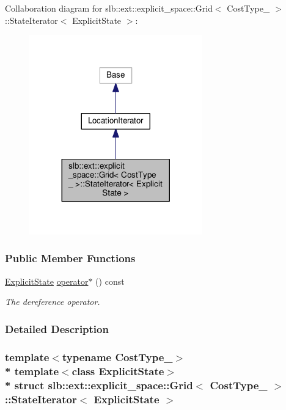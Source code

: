 Collaboration diagram for slb\+:\+:ext\+:\+:explicit\+\_\+space\+:\+:Grid$<$ Cost\+Type\+\_\+ $>$\+:\+:State\+Iterator$<$ Explicit\+State $>$\+:\nopagebreak
\begin{figure}[H]
\begin{center}
\leavevmode
\includegraphics[width=212pt]{structslb_1_1ext_1_1explicit__space_1_1Grid_1_1StateIterator__coll__graph}
\end{center}
\end{figure}
\subsubsection*{Public Member Functions}
\begin{DoxyCompactItemize}
\item 
\hyperlink{structslb_1_1core_1_1sb_1_1ExplicitState}{Explicit\+State} \hyperlink{structslb_1_1ext_1_1explicit__space_1_1Grid_1_1StateIterator_acedbcf5fd3e8e08a572a15a4c1eff0fd}{operator$\ast$} () const 
\begin{DoxyCompactList}\small\item\em The dereference operator. \end{DoxyCompactList}\end{DoxyCompactItemize}


\subsubsection{Detailed Description}
\subsubsection*{template$<$typename Cost\+Type\+\_\+$>$\\*
template$<$class Explicit\+State$>$\\*
struct slb\+::ext\+::explicit\+\_\+space\+::\+Grid$<$ Cost\+Type\+\_\+ $>$\+::\+State\+Iterator$<$ Explicit\+State $>$}

